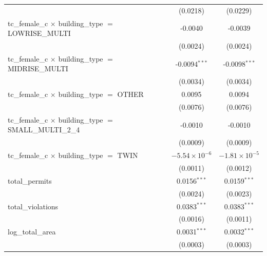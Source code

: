 \begin{tabular}{lcc}
                                                                       & (0.0218)               & (0.0229)\\   
   tc\_female\_c $\times$ building\_type $=$ LOWRISE\_MULTI            & -0.0040                & -0.0039\\   
                                                                       & (0.0024)               & (0.0024)\\   
   tc\_female\_c $\times$ building\_type $=$ MIDRISE\_MULTI            & -0.0094$^{***}$        & -0.0098$^{***}$\\   
                                                                       & (0.0034)               & (0.0034)\\   
   tc\_female\_c $\times$ building\_type $=$ OTHER                     & 0.0095                 & 0.0094\\   
                                                                       & (0.0076)               & (0.0076)\\   
   tc\_female\_c $\times$ building\_type $=$ SMALL\_MULTI\_2\_4        & -0.0010                & -0.0010\\   
                                                                       & (0.0009)               & (0.0009)\\   
   tc\_female\_c $\times$ building\_type $=$ TWIN                      & $-5.54\times 10^{-6}$  & $-1.81\times 10^{-5}$\\    
                                                                       & (0.0011)               & (0.0012)\\   
   total\_permits                                                      & 0.0156$^{***}$         & 0.0159$^{***}$\\   
                                                                       & (0.0024)               & (0.0023)\\   
   total\_violations                                                   & 0.0383$^{***}$         & 0.0383$^{***}$\\   
                                                                       & (0.0016)               & (0.0011)\\   
   log\_total\_area                                                    & 0.0031$^{***}$         & 0.0032$^{***}$\\   
                                                                       & (0.0003)               & (0.0003)\\   

\end{tabular}
